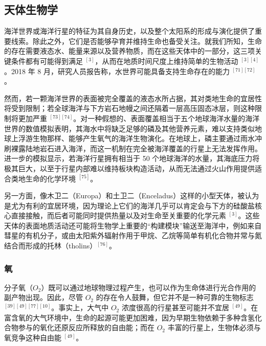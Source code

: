 \subsection{天体生物学}
海洋世界或海洋行星的特征为其自身历史，以及整个太阳系的形成与演化提供了重要线索。除此之外，它们是否能够孕育并维持生命也备受关注。就我们所知，生命的存在需要液态水、能量来源以及营养物质，而在这些天体中的一部分，这三项关键条件都有可能得到满足 $^{[3]}$，从而在地质时间尺度上维持简单的生物活动 $^{[3][4]}$。2018 年 8 月，研究人员报告称，水世界可能具备支持生命存在的能力 $^{[71][72]}$。

然而，若一颗海洋世界的表面被完全覆盖的液态水所占据，其对类地生命的宜居性将受到限制；若全球海洋与下方岩石地幔之间还隔着一层高压固态冰层，则这种限制将更加严重 $^{[73][74]}$。对一种假想的、表面覆盖相当于五个地球海洋水量的海洋世界的数值模拟表明，其海水中将缺乏足够的磷及其他营养元素，难以支持类似地球上浮游生物那样、能够产生氧气的海洋生物演化。在地球上，磷主要通过雨水冲刷裸露陆地岩石进入海洋，而这一机制在完全被海洋覆盖的行星上无法发挥作用。进一步的模拟显示，若海洋行星拥有相当于 50 个地球海洋的水量，其海底压力将极其巨大，以至于行星内部难以维持板块构造活动，从而无法通过火山作用提供适合类地生命的化学环境 $^{[75]}$。

另一方面，像木卫二（Europa）和土卫二（Enceladus）这样的小型天体，被认为是尤为有利的宜居环境，因为理论上它们的海洋几乎可以肯定会与下方的硅酸盐核心直接接触，而后者可能同时提供热量以及对生命至关重要的化学元素 $^{[3]}$。这些天体的表面地质活动还可能将生物学上重要的“构建模块”输送至海洋中，例如来自彗星的有机分子，或由太阳紫外辐射作用于甲烷、乙烷等简单有机化合物并常与氮结合而形成的托林（tholins）$^{[76]}$。
\subsubsection{氧}
分子氧（$O_2$）既可以通过地球物理过程产生，也可以作为生命体进行光合作用的副产物出现。因此，尽管 $O_2$ 的存在令人鼓舞，但它并不是一种可靠的生物标志 $^{[39][49][77][10]}$。事实上，大气中 $O_2$ 浓度很高的行星甚至可能并不宜居 $^{[49]}$。在富含氧的大气环境中，生命的起源可能更加困难，因为早期生物依赖于多种含氢化合物参与的氧化还原反应所释放的自由能；而在 $O_2$ 丰富的行星上，生物体必须与氧竞争这种自由能 $^{[49]}$。
